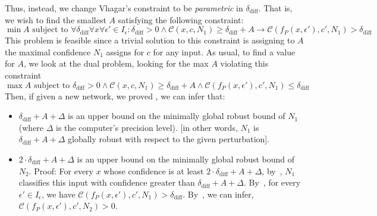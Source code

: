 \documentclass[11pt]{article}
\begin{document}
Thus, instead, %
we change Vhagar's constraint to be \emph{parametric} in $\delta_\text{diff}$. That is, we wish to find the smallest $A$ satisfying the following constraint:
\begin{equation}\label{eq:func}
\min A\text { subject to }\forall \delta_\text{diff} \forall{x}\forall{\epsilon'}\in{I_\epsilon}:    \delta_\text{diff}>0\land \mathcal{C}(x,c,N_1) \geq \delta_\text{diff} + A\rightarrow \mathcal{C}(f_P(x,\epsilon'),c',N_1)>\delta_\text{diff}
\end{equation}
This problem is feasible since a trivial solution to this constraint is assigning to $A$ the maximal confidence $N_1$ assigns for $c$ for any input. %
As usual, to find a value for $A$, we look at the dual problem, looking for the max $A$ violating this constraint
\begin{equation}\label{eq:ourproof}
 \max A \text{ subject to } \delta_\text{diff}>0\land \mathcal{C}(x,c,N_1) \geq \delta_\text{diff} + A\land \mathcal{C}(f_P(x,\epsilon'),c',N_1)\leq \delta_\text{diff}
 \end{equation}
  Then, if given a new network, we proved , we can infer that:
  \begin{itemize}
    \item $ \delta_\text{diff} +A+\Delta$ is an upper bound on the minimally global robust bound of $N_1$ (where $\Delta$ is the computer's precision level). [in other words, $N_1$ is $ \delta_\text{diff} +A+\Delta$ globally robust with respect to the given perturbation].
    \item $ 2\cdot \delta_\text{diff} +A+\Delta$ is an upper bound on the minimally global robust bound of $N_2$. Proof:
    For every $x$ whose confidence is at least $2\cdot \delta_\text{diff} +A+\Delta$, by~, $N_1$ classifies this input with confidence greater than $\delta_\text{diff} +A+\Delta$. By~, for every $\epsilon'\in I_\epsilon$, we have $\mathcal{C}(f_P(x,\epsilon'),c',N_1)>\delta_\text{diff}$. By~, we can infer, $\mathcal{C}(f_P(x,\epsilon'),c',N_2)>0$. 
  \end{itemize}
   
\end{document}
